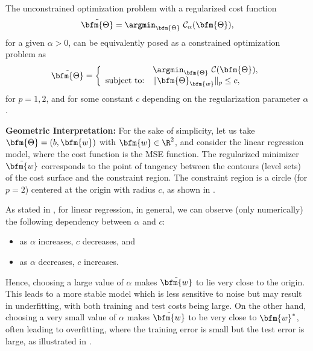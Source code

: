 
\begin{remark}

The unconstrained optimization problem with a regularized cost function
$$
\tilde{\bfm{\Theta}} = \argmin_{\bfm{\Theta}}~ \mathcal{C}_{\alpha} (\bfm{\Theta}),
$$
for a given $\alpha>0$, can be equivalently posed as a constrained optimization problem as
$$
\tilde{\bfm{\Theta}} = \left\{\begin{array}{ll}
					&\displaystyle{\argmin_{\bfm{\Theta}}}~ \mathcal{C}(\bfm{\Theta}),\\
					\text{subject to:} & \|\bfm{\Theta}_{\bfm{w}}\|_p \le c,
					\end{array}\right.
$$
for $p=1,2$, and for some constant $c$ depending on the regularization parameter $\alpha$.

\textbf{Geometric Interpretation:}
For the sake of simplicity, let us take $\bfm{\Theta} = (b,\bfm{w})$ with $\bfm{w}\in \R^2$, and consider the linear regression model, where the cost function is the MSE function. The regularized minimizer $\tilde{\bfm{w}}$ corresponds to the point of tangency between the contours (level sets) of the cost surface and the constraint region. The constraint region is a circle (for $p=2$) centered at the origin with radius $c$, as shown in .

As stated in , for linear regression, in general, we can observe (only numerically) the following dependency between $\alpha$ and $c$:
\begin{itemize}
\item as $\alpha$ increases, $c$ decreases, and
\item as $\alpha$ decreases, $c$ increases.
\end{itemize}
Hence, choosing a large value of $\alpha$ makes $\tilde{\bfm{w}}$ to lie very close to the origin.  This leads to a more stable model which is less sensitive to noise but may result in underfitting, with both training and test costs being large.  On the other hand, choosing a very small value of $\alpha$ makes $\tilde{\bfm{w}}$ to be very close to $\bfm{w}^*$, often leading to overfitting, where the training error is small but the test error is large, as illustrated in .

\end{remark}
